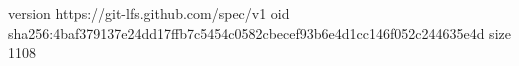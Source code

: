 version https://git-lfs.github.com/spec/v1
oid sha256:4baf379137e24dd17ffb7c5454c0582cbecef93b6e4d1cc146f052c244635e4d
size 1108
